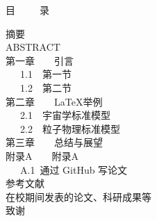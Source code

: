 \newpage
\pagestyle{fancy}
\thispagestyle{empty}
 \vspace{1.0cm}
 \centerline{\hei \sanhao 目\ \ \ \ \ 录}
\vspace{0.5cm} \label{content} \noindent
{\hei \xiaosihao 摘要 \dotfill \pageref{zhaiyao}}\\[0.2cm]
{\hei \xiaosihao ABSTRACT \dotfill \pageref{abs}}\\[0.2cm]
{\hei \xiaosihao 第一章\ \ \ \ 引言 \dotfill \pageref{1}}\\[0.2cm]
\hspace*{0.5cm} \ \  \ 1.1\ \  第一节\dotfill \pageref{1.1}\\
\hspace*{0.5cm} \ \  \ 1.2\ \  第二节\dotfill \pageref{1.2}\\[0.2cm] %
{\hei \xiaosihao 第二章\ \ \ \ \LaTeX 举例 \dotfill \pageref{2}}\\[0.2cm]
\hspace*{0.5cm} \ \  \ 2.1\ \  宇宙学标准模型\dotfill \pageref{2.1}\\
\hspace*{0.5cm} \ \  \ 2.2\ \  粒子物理标准模型\dotfill \pageref{2.2}\\[0.2cm]
{\hei \xiaosihao 第三章\ \ \ \ 总结与展望 \dotfill \pageref{conclusion}}\\[0.2cm]
{\hei \xiaosihao 附录A\ \ \ \ 附录A \dotfill \pageref{A}}\\
\hspace*{0.5cm} \ \  \ A.1\ 通过 GitHub 写论文\dotfill \pageref{A.1}\\[0.2cm]
{\hei \xiaosihao 参考文献 \dotfill \pageref{bib}}\\[0.2cm]
{\hei \xiaosihao 在校期间发表的论文、科研成果等\dotfill \pageref{work}} \\[0.2cm]
{\hei \xiaosihao 致谢\dotfill \pageref{acknowlegement}}